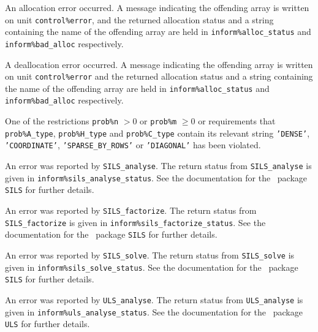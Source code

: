 \documentclass{galahad}
\begin{document}
\begin{description}

 An allocation error occurred. 
A message indicating the offending 
array is written on unit {\tt control\%error}, and the returned allocation 
status and a string containing the name of the offending array
are held in {\tt inform\%alloc\_\-status}
and {\tt inform\%bad\_alloc} respectively.

 A deallocation error occurred. 
A message indicating the offending 
array is written on unit {\tt control\%error} and the returned allocation 
status and a string containing the name of the offending array
are held in {\tt inform\%alloc\_\-status}
and {\tt inform\%bad\_alloc} respectively.

 One of the restrictions 
   {\tt prob\%n} $> 0$ or {\tt prob\%m} $\geq  0$
    or requirements that {\tt prob\%A\_type}, {\tt prob\%H\_type} and
    {\tt prob\%C\_type} contain its relevant string
    {\tt 'DENSE'}, {\tt 'COORDINATE'}, {\tt 'SPARSE\_BY\_ROWS'}
    or {\tt 'DIAGONAL'}
    has been violated.


 An error was reported by {\tt SILS\_analyse}. The return
status from {\tt SILS\_analyse} is given in 
{\tt inform\%sils\_\-analyse\_status}.
See the documentation for the \galahad\ package {\tt SILS} for further details.

 An error was reported by {\tt SILS\_factorize}. 
The return status from {\tt SILS\_factorize} is given in 
{\tt inform\%sils\_\-factorize\_status}.
See the documentation for the \galahad\ package {\tt SILS} for further details.

 An error was reported by {\tt SILS\_solve}. The return
status from {\tt SILS\_solve} is given in {\tt inform\%sils\_solve\_\-status}.
See the documentation for the \galahad\ package {\tt SILS} for further details.

 An error was reported by {\tt ULS\_analyse}. The return
status from {\tt ULS\_analyse} is given in {\tt inform\%uls\_analyse\_\-status}.
See the documentation for the \galahad\ package {\tt ULS} for further details.


\end{description}
\end{document}

